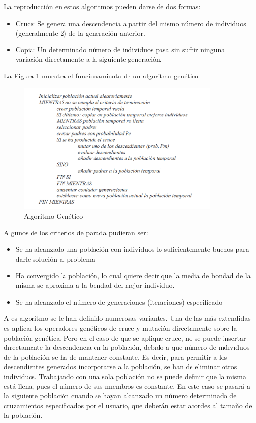 \documentclass[a4paper,12pt]{book}
\begin{document}
		La reproducción en estos algoritmos pueden darse de dos formas:
		\begin{itemize}
			\item Cruce: Se genera una descendencia a partir del mismo número de individuos (generalmente 2) de la generación anterior. 
			\item Copia: Un determinado número de individuos pasa sin sufrir ninguna variación directamente a la siguiente generación.
		\end{itemize}
	
		La Figura \ref{AlgoritmoeGenetico} muestra el funcionamiento de un algoritmo genético
	
		\begin{figure}[h]
			\centering
			\includegraphics[width=10cm]{./Graphics/AlgoritmoGenetico.png}
			\caption{Algoritmo Genético}
			\label{AlgoritmoeGenetico}
		\end{figure}
	
		Algunos de los criterios de parada pudieran ser:
		\begin{itemize}
			\item Se ha alcanzado una población con individuos lo suficientemente buenos para darle solución al problema.
			\item Ha convergido la población, lo cual quiere decir que la  media  de  bondad  de  la  misma  se aproxima a la bondad del mejor individuo.
			\item Se ha alcanzado el número de generaciones (iteraciones) especificado
		\end{itemize}
	
		A es algoritmo se le han definido numerosas variantes. Una de las más extendidas es aplicar los operadores genéticos de cruce y mutación directamente sobre la población genética. Pero en el caso de que se aplique cruce, no se puede insertar directamente la descendencia en la población, debido a que número de individuos de la población se ha de mantener constante. Es decir, para permitir a los descendientes generados incorporarse a la población, se  han  de  eliminar  otros individuos. Trabajando con una sola población no se puede definir que la misma está llena, pues el número de sus miembros es constante. En este caso se pasará a la siguiente población cuando se hayan alcanzado un número determinado de cruzamientos especificados por el usuario, que deberán estar acordes al tamaño de la población.
		
\end{document}
